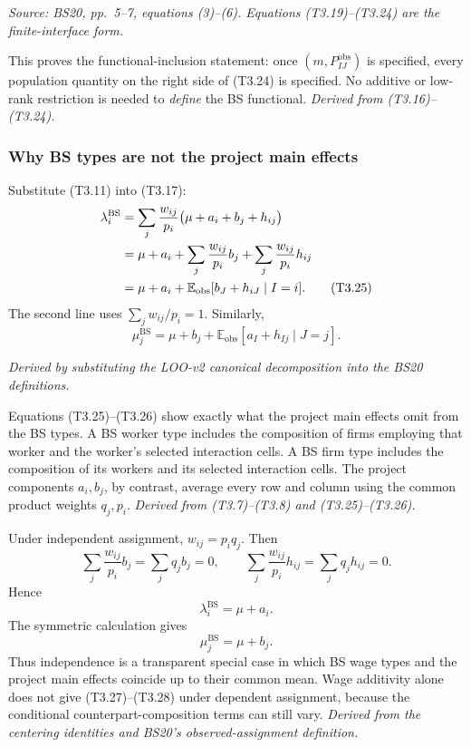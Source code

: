 \documentclass[11pt]{article}
\begin{document}
\textit{Source: BS20, pp.\ 5--7, equations (3)--(6).  Equations
(T3.19)--(T3.24) are the finite-interface form.}

This proves the functional-inclusion statement: once
\((m,P^{\mathrm{obs}}_{IJ})\) is specified, every population quantity on the
right side of (T3.24) is specified.  No additive or low-rank restriction is
needed to \emph{define} the BS functional.
\textit{Derived from (T3.16)--(T3.24).}

\subsubsection{Why BS types are not the project main effects}

Substitute (T3.11) into (T3.17):
\begin{align}
\lambda_i^{\mathrm{BS}}
&=
\sum_j\frac{w_{ij}}{p_i}
\bigl(\mu+a_i+b_j+h_{ij}\bigr) \notag\\
&=
\mu+a_i
+\sum_j\frac{w_{ij}}{p_i}b_j
+\sum_j\frac{w_{ij}}{p_i}h_{ij} \notag\\
&=
\mu+a_i
+\mathbb E_{\mathrm{obs}}[b_J+h_{iJ}\mid I=i].
\tag{T3.25}
\end{align}
The second line uses
\(\sum_jw_{ij}/p_i=1\).  Similarly,
\[
\mu_j^{\mathrm{BS}}
=
\mu+b_j
+\mathbb E_{\mathrm{obs}}[a_I+h_{Ij}\mid J=j].
\tag{T3.26}
\]

\textit{Derived by substituting the LOO-v2 canonical decomposition into the
BS20 definitions.}

Equations (T3.25)--(T3.26) show exactly what the project main effects omit from
the BS types.  A BS worker type includes the composition of firms employing
that worker and the worker's selected interaction cells.  A BS firm type
includes the composition of its workers and its selected interaction cells.
The project components \(a_i,b_j\), by contrast, average every row and column
using the common product weights \(q_j,p_i\).
\textit{Derived from (T3.7)--(T3.8) and (T3.25)--(T3.26).}

Under independent assignment, \(w_{ij}=p_iq_j\).  Then
\[
\sum_j\frac{w_{ij}}{p_i}b_j=\sum_jq_jb_j=0,
\qquad
\sum_j\frac{w_{ij}}{p_i}h_{ij}=\sum_jq_jh_{ij}=0.
\]
Hence
\[
\lambda_i^{\mathrm{BS}}=\mu+a_i.
\tag{T3.27}
\]
The symmetric calculation gives
\[
\mu_j^{\mathrm{BS}}=\mu+b_j.
\tag{T3.28}
\]
Thus independence is a transparent special case in which BS wage types and
the project main effects coincide up to their common mean.  Wage additivity
alone does not give (T3.27)--(T3.28) under dependent assignment, because the
conditional counterpart-composition terms can still vary.
\textit{Derived from the centering identities and BS20's observed-assignment
definition.}
\end{document}
